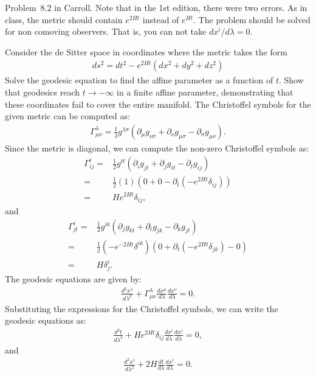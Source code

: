 \clearpage
{}
Problem~8.2 in Carroll. Note that in the 1st edition, there were two errors. As in class, the metric should contain $e^{2Ht}$ instead of $e^{Ht}$. The problem should be solved for non comoving observers. That is, you can not take $dx^i/d\lambda=0$.

Consider the de Sitter space in coordinates where the metric takes the form 
\begin{align}
    ds^2=dt^2-e^{2Ht}(dx^2+dy^2+dz^2)
\end{align} 
Solve the geodesic equation to find the affine parameter as a function of $t$. Show that geodesics reach $t\to-\infty$ in a finite affine parameter, demonstrating that these coordinates fail to cover the entire manifold.
\answer{}
The Christoffel symbols for the given metric can be computed as:
\begin{align}
    \Gamma^\lambda_{\mu\nu}=\frac{1}{2} g^{\lambda\sigma} (\partial_\mu g_{\nu\sigma} + \partial_\nu g_{\mu\sigma} - \partial_\sigma g_{\mu\nu}).
\end{align}
Since the metric is diagonal, we can compute the non-zero Christoffel symbols as:
\begin{align}
    \Gamma^t_{ij}=&\frac{1}{2} g^{tt} (\partial_i g_{jt} + \partial_j g_{it} - \partial_t g_{ij})\\
    =&\frac{1}{2} (1) (0 + 0 - \partial_t (-e^{2Ht} \delta_{ij}))\\
    =&H e^{2Ht} \delta_{ij},
\end{align}
and
\begin{align}
    \Gamma^i_{jt}=&\frac{1}{2} g^{ik} (\partial_j g_{kt} + \partial_t g_{jk} - \partial_k g_{jt})\\
    =&\frac{1}{2} (-e^{-2Ht} \delta^{ik}) (0 + \partial_t (-e^{2Ht} \delta_{jk}) - 0)\\
    =&H \delta^i_j.
\end{align}
The geodesic equations are given by:
\begin{align}
    \frac{d^2 x^\lambda}{d\lambda^2} + \Gamma^\lambda_{\mu\nu} \frac{dx^\mu}{d\lambda} \frac{dx^\nu}{d\lambda} = 0.
\end{align}
Substituting the expressions for the Christoffel symbols, we can write the geodesic equations as:
\begin{align}
    \frac{d^2 t}{d\lambda^2} + H e^{2Ht} \delta_{ij} \frac{dx^i}{d\lambda} \frac{dx^j}{d\lambda} = 0,
\end{align}and
\begin{align}
    \frac{d^2 x^i}{d\lambda^2} + 2H \frac{dt}{d\lambda} \frac{dx^i}{d\lambda} = 0.
\end{align}

